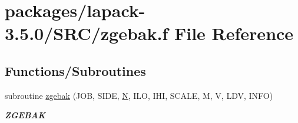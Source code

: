 \hypertarget{zgebak_8f}{}\section{packages/lapack-\/3.5.0/\+S\+R\+C/zgebak.f File Reference}
\label{zgebak_8f}
\subsection*{Functions/\+Subroutines}
\begin{DoxyCompactItemize}
\item 
subroutine \hyperlink{group__complex16GEcomputational_ga84f450f70925de169aa4be5ce75a51cc}{zgebak} (J\+O\+B, S\+I\+D\+E, \hyperlink{polmisc_8c_a0240ac851181b84ac374872dc5434ee4}{N}, I\+L\+O, I\+H\+I, S\+C\+A\+L\+E, M, V, L\+D\+V, I\+N\+F\+O)
\begin{DoxyCompactList}\small\item\em {\bfseries Z\+G\+E\+B\+A\+K} \end{DoxyCompactList}\end{DoxyCompactItemize}
